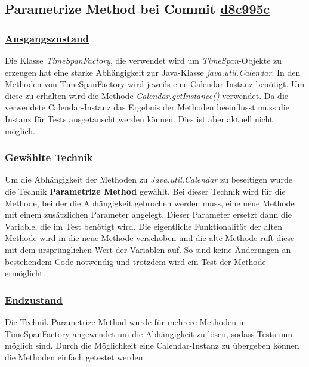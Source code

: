 \documentclass[12pt]{article}
\begin{document}
\newpage

\subsection{Parametrize Method bei Commit \href{https://github.com/lukaspanni/OpenSourceStats/commit/d8c995c387a792a6d83c852119760b0c57a63c02} {d8c995c}}

\subsubsection*{\href{https://github.com/lukaspanni/OpenSourceStats/tree/eafe840d0bfc8a08beca01709003d5afe7e59963/app/src/main/java/de/lukaspanni/opensourcestats/util/TimeSpanFactory.java}{Ausgangszustand}}
Die Klasse \textit{TimeSpanFactory}, die verwendet wird um \textit{TimeSpan}-Objekte zu erzeugen hat eine starke Abhängigkeit zur Java-Klasse \textit{java.util.Calendar}.
In den Methoden von TimeSpanFactory wird jeweils eine Calendar-Instanz benötigt. 
Um diese zu erhalten wird die Methode \textit{Calendar.getInstance()} verwendet.
Da die verwendete Calendar-Instanz das Ergebnis der Methoden beeinflusst muss die Instanz für Tests ausgetauscht werden können.
Dies ist aber aktuell nicht möglich.

\subsubsection*{Gewählte Technik}
Um die Abhängigkeit der Methoden zu \textit{Java.util.Calendar} zu beseitigen wurde die Technik \textbf{Parametrize Method} gewählt.
Bei dieser Technik wird für die Methode, bei der die Abhängigkeit gebrochen werden muss, eine neue Methode mit einem zusätzlichen Parameter angelegt.
Dieser Parameter ersetzt dann die Variable, die im Test benötigt wird.
Die eigentliche Funktionalität der alten Methode wird in die neue Methode verschoben und die alte Methode ruft diese mit dem ursprünglichen Wert der Variablen auf.
So sind keine Änderungen an bestehendem Code notwendig und trotzdem wird ein Test der Methode ermöglicht.

\subsubsection*{\href{https://github.com/lukaspanni/OpenSourceStats/tree/d8c995c387a792a6d83c852119760b0c57a63c02/app/src/main/java/de/lukaspanni/opensourcestats/util/TimeSpanFactory.java}{Endzustand}}

Die Technik Parametrize Method wurde für mehrere Methoden in TimeSpanFactory angewendet um die Abhängigkeit zu lösen, sodass Tests nun möglich sind.
Durch die Möglichkeit eine Calendar-Instanz zu übergeben können die Methoden einfach getestet werden.
\end{document}
